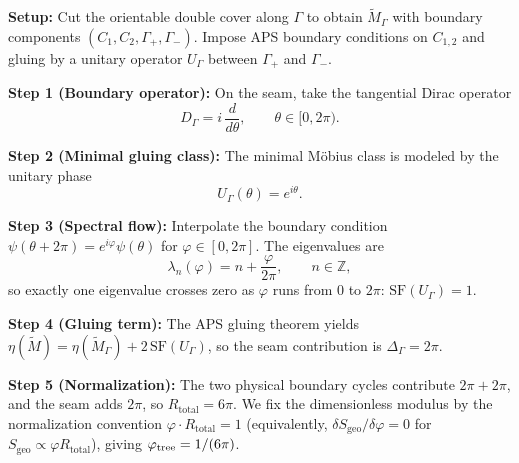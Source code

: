 \begin{tcolorbox}[colback=green!3, colframe=green!50!black, 
    title={\textbf{Proof Sketch for $\phitree = 1/(6\pi)$ (via $\eta$-gluing)}}, fonttitle=\bfseries\small]
\textbf{Setup:} Cut the orientable double cover along $\Gamma$ to obtain
$\widetilde{M}_\Gamma$ with boundary components $(C_1,C_2,\Gamma_+,\Gamma_-)$.
Impose APS boundary conditions on $C_{1,2}$ and gluing by a unitary operator
$U_\Gamma$ between $\Gamma_+$ and $\Gamma_-$.

\textbf{Step 1 (Boundary operator):} On the seam, take the tangential Dirac operator
\begin{equation}
    D_\Gamma = i\,\frac{d}{d\theta}, \qquad \theta\in[0,2\pi).
\end{equation}

\textbf{Step 2 (Minimal gluing class):} The minimal M\"obius class is modeled by the
unitary phase
\begin{equation}
    U_\Gamma(\theta)=e^{i\theta}.
\end{equation}

\textbf{Step 3 (Spectral flow):} Interpolate the boundary condition
$\psi(\theta+2\pi)=e^{i\varphi}\psi(\theta)$ for $\varphi\in[0,2\pi]$. The eigenvalues are
\begin{equation}
    \lambda_n(\varphi)=n+\frac{\varphi}{2\pi}, \qquad n\in\mathbb{Z},
\end{equation}
so exactly one eigenvalue crosses zero as $\varphi$ runs from $0$ to $2\pi$:
$\mathrm{SF}(U_\Gamma)=1$.

\textbf{Step 4 (Gluing term):} The APS gluing theorem yields
$\eta(\widetilde{M}) = \eta(\widetilde{M}_\Gamma) + 2\,\mathrm{SF}(U_\Gamma)$,
so the seam contribution is $\Delta_\Gamma=2\pi$.

\textbf{Step 5 (Normalization):} The two physical boundary cycles contribute $2\pi+2\pi$,
and the seam adds $2\pi$, so $R_{\text{total}}=6\pi$. We fix the dimensionless modulus
by the normalization convention $\varphi\cdot R_{\text{total}}=1$ (equivalently,
$\delta S_{\mathrm{geo}}/\delta\varphi=0$ for $S_{\mathrm{geo}}\propto\varphi R_{\text{total}}$),
giving $\phitree=1/(6\pi)$.
\end{tcolorbox}


